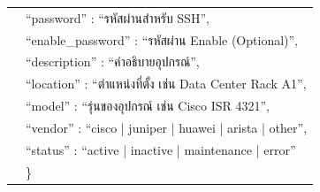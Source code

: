 \begin{table}[H]
\begin{tabularx}{\textwidth}{|l|L|}
                        & \hspace{1em} ``password'' : ``รหัสผ่านสำหรับ SSH'', \nonumber \\
                        & \hspace{1em} ``enable\_password'' : ``รหัสผ่าน Enable (Optional)'', \nonumber \\
                        & \hspace{1em} ``description'' : ``คำอธิบายอุปกรณ์'', \nonumber \\
                        & \hspace{1em} ``location'' : ``ตำแหน่งที่ตั้ง เช่น Data Center Rack A1'', \nonumber \\
                        & \hspace{1em} ``model'' : ``รุ่นของอุปกรณ์ เช่น Cisco ISR 4321'', \nonumber \\
                        & \hspace{1em} ``vendor'' : ``cisco | juniper | huawei | arista | other'', \nonumber \\
                        & \hspace{1em} ``status'' : ``active | inactive | maintenance | error'' \nonumber \\
                        & \} \\
        \hline
    \end{tabularx}
\end{table}

